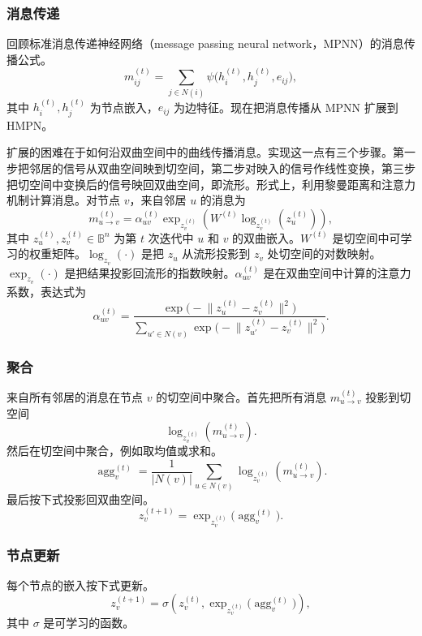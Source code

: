 \subsubsection{消息传递}
回顾标准消息传递神经网络（message passing neural network，MPNN）的消息传播公式。
\begin{equation*}
  m_{ij}^{(t)}=\sum_{j\in N(i)}\psi\bigl(h_i^{(t)},h_j^{(t)},e_{ij}\bigr),
  \tag{2.137}\label{eq:2.137}
\end{equation*}
其中 $h_i^{(t)},h_j^{(t)}$ 为节点嵌入，$e_{ij}$ 为边特征。现在把消息传播从 MPNN 扩展到 HMPN。

扩展的困难在于如何沿双曲空间中的曲线传播消息。实现这一点有三个步骤。第一步把邻居的信号从双曲空间映到切空间，第二步对映入的信号作线性变换，第三步把切空间中变换后的信号映回双曲空间，即流形。形式上，利用黎曼距离和注意力机制计算消息。对节点 $v$，来自邻居 $u$ 的消息为
\begin{equation*}
  m_{u\to v}^{(t)}
   =\alpha_{uv}^{(t)}\exp_{z_v^{(t)}}\!\left(
       W^{(t)}\log_{z_v^{(t)}}(z_u^{(t)})\right),
  \tag{2.138}\label{eq:2.138}
\end{equation*}
其中 $z_u^{(t)},z_v^{(t)}\in\mathbb B^n$ 为第 $t$ 次迭代中 $u$ 和 $v$ 的双曲嵌入。$W^{(t)}$ 是切空间中可学习的权重矩阵。$\log_{z_v}(\cdot)$ 是把 $z_u$ 从流形投影到 $z_v$ 处切空间的对数映射。$\exp_{z_v}(\cdot)$ 是把结果投影回流形的指数映射。$\alpha_{uv}^{(t)}$ 是在双曲空间中计算的注意力系数，表达式为
\[
  \alpha_{uv}^{(t)}
   =\frac{\exp\bigl(-\lVert z_u^{(t)}-z_v^{(t)}\rVert^2\bigr)}
          {\displaystyle\sum_{u'\in N(v)}
           \exp\bigl(-\lVert z_{u'}^{(t)}-z_v^{(t)}\rVert^2\bigr)}.
\]

\subsubsection{聚合}
来自所有邻居的消息在节点 $v$ 的切空间中聚合。首先把所有消息 $m_{u\to v}^{(t)}$ 投影到切空间
\[
  \log_{z_v^{(t)}}(m_{u\to v}^{(t)}).
\]
然后在切空间中聚合，例如取均值或求和。
\begin{equation*}
  \operatorname{agg}_v^{(t)}
   =\frac{1}{|N(v)|}\sum_{u\in N(v)}\log_{z_v^{(t)}}(m_{u\to v}^{(t)}).
  \tag{2.139}\label{eq:2.139}
\end{equation*}
最后按下式投影回双曲空间。
\begin{equation*}
  z_v^{(t+1)}=\exp_{z_v^{(t)}}\bigl(\operatorname{agg}_v^{(t)}\bigr).
  \tag{2.140}\label{eq:2.140}
\end{equation*}

\subsubsection{节点更新}
每个节点的嵌入按下式更新。
\begin{equation*}
  z_v^{(t+1)}=\sigma\!\left(z_v^{(t)},
      \exp_{z_v^{(t)}}\bigl(\operatorname{agg}_v^{(t)}\bigr)\right),
  \tag{2.141}\label{eq:2.141}
\end{equation*}
其中 $\sigma$ 是可学习的函数。

